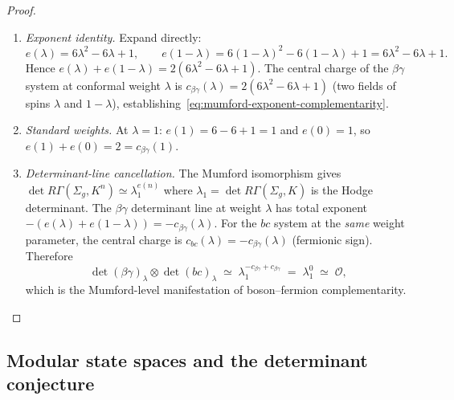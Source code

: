 \begin{proof}
\leavevmode
\begin{enumerate}[label=\textup{(\roman*)}]
\item \emph{Exponent identity.}
Expand directly:
\[
 e(\lambda) = 6\lambda^2 - 6\lambda + 1,
 \qquad
 e(1-\lambda) = 6(1-\lambda)^2 - 6(1-\lambda) + 1
 = 6\lambda^2 - 6\lambda + 1.
\]
Hence $e(\lambda) + e(1-\lambda) = 2(6\lambda^2 - 6\lambda + 1)$.
The central charge of the $\beta\gamma$ system at conformal weight
$\lambda$ is $c_{\beta\gamma}(\lambda) = 2(6\lambda^2 - 6\lambda + 1)$
\textup{(}two fields of spins $\lambda$ and $1-\lambda$\textup{)},
establishing~\eqref{eq:mumford-exponent-complementarity}.

\item \emph{Standard weights.}
At $\lambda = 1$: $e(1) = 6 - 6 + 1 = 1$ and $e(0) = 1$, so
$e(1) + e(0) = 2 = c_{\beta\gamma}(1)$.

\item \emph{Determinant-line cancellation.}
The Mumford isomorphism gives
$\det R\Gamma(\Sigma_g, K^n) \simeq \lambda_1^{e(n)}$
where $\lambda_1 = \det R\Gamma(\Sigma_g, K)$ is the Hodge
determinant. The $\beta\gamma$ determinant line at weight $\lambda$
has total exponent $-(e(\lambda) + e(1-\lambda)) = -c_{\beta\gamma}(\lambda)$.
For the $bc$ system at the \emph{same} weight parameter, the central
charge is $c_{bc}(\lambda) = -c_{\beta\gamma}(\lambda)$
\textup{(}fermionic sign\textup{)}. Therefore
\[
 \det(\beta\gamma)_\lambda \otimes \det(bc)_\lambda
 \;\simeq\;
 \lambda_1^{-c_{\beta\gamma} + c_{\beta\gamma}}
 \;=\;
 \lambda_1^{0}
 \;\simeq\;
 \mathcal{O},
\]
which is the Mumford-level manifestation of boson--fermion
complementarity.
\qedhere
\end{enumerate}
\end{proof}

\subsection{Modular state spaces and the determinant conjecture}


